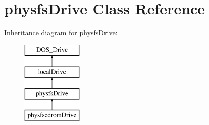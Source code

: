\hypertarget{classphysfsDrive}{\section{physfs\-Drive Class Reference}
\label{classphysfsDrive}
}
Inheritance diagram for physfs\-Drive\-:\begin{figure}[H]
\begin{center}
\leavevmode
\includegraphics[height=4.000000cm]{classphysfsDrive}
\end{center}
\end{figure}
